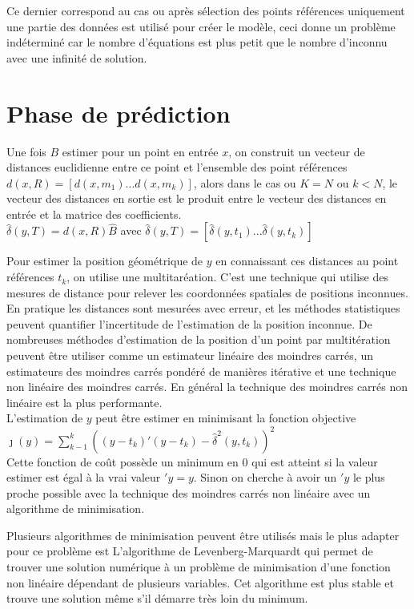 \documentclass[12pt,a4paper]{report}
\begin{document}
Ce dernier correspond au cas ou après sélection des points références uniquement une partie des données est utilisé pour créer le modèle, ceci donne un problème indéterminé car le nombre d'équations est plus petit que le nombre d'inconnu avec une infinité de solution. 
\section{Phase de prédiction}
\par Une fois $B$ estimer pour un point en entrée $x$, on construit un vecteur de distances euclidienne entre ce point et l'ensemble des point références $d(x,R) = [d(x,m_1)...d(x,m_k)]$, alors dans le cas ou $K = N$ ou $k < N$, le vecteur des distances en sortie est le produit entre le vecteur des distances en entrée et la matrice des coefficients.\\
$\hat{\delta}(y,T) = d(x,R)\hat{B}$ avec $\hat{\delta}(y,T) = [\hat{\delta}(y,t_1)...\hat{\delta}(y,t_k)]$

\par Pour estimer la position géométrique de $y$ en connaissant ces distances au point références $t_k$, on utilise une multitaréation. C'est une technique qui utilise des mesures de distance pour relever les coordonnées spatiales de positions inconnues. En pratique les distances sont mesurées avec erreur, et les méthodes statistiques peuvent quantifier l'incertitude de l'estimation de la position inconnue. De nombreuses méthodes d'estimation de la position d'un point par multitération peuvent être utiliser comme un estimateur linéaire des moindres carrés, un estimateurs des moindres carrés pondéré de manières itérative et une technique non linéaire des moindres carrés. En général la technique des moindres carrés non linéaire est la plus performante.\\
L'estimation de $y$ peut être estimer en minimisant la fonction objective \\
$\jmath(y) = \sum_{k-1}^{k}((y-t_k)\prime(y-t_k)-\hat{\delta}^2(y,t_k))^2$ \\
Cette fonction de coût possède un minimum en 0 qui est atteint si la valeur estimer est égal à la vrai valeur $\prime{y} = y$. Sinon on cherche à avoir un $\prime{y}$ le plus proche possible avec la technique des moindres carrés non linéaire avec un algorithme de minimisation. \\
\par Plusieurs algorithmes de minimisation peuvent être utilisés mais le plus adapter pour ce problème est L'algorithme de Levenberg-Marquardt qui permet de trouver une solution numérique à un problème de minimisation d'une fonction non linéaire dépendant de plusieurs variables. Cet algorithme est plus stable et trouve une solution même s'il démarre très loin du minimum. 
\end{document}
